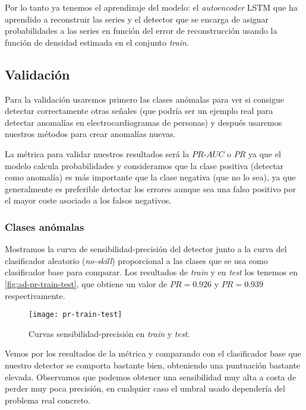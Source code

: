 Por lo tanto ya tenemos el aprendizaje del modelo: el \emph{autoencoder} LSTM que ha aprendido a reconstruir las series y el detector que se encarga de asignar probabilidades a las series en función del error de reconstrucción usando la función de densidad estimada en el conjunto \emph{train}.

\subsection{Validación}

Para la validación usaremos primero las clases anómalas para ver si consigue detectar correctamente otras señales (que podría ser un ejemplo real para detectar anomalías en electrocardiogramas de personas) y después usaremos nuestros métodos para crear anomalías nuevas.

La métrica para validar nuestros resultados será la $PR$-$AUC$ o $PR$ ya que el modelo calcula probabilidades y consideramos que la clase positiva (detectar como anomalía) es más importante que la clase negativa (que no lo sea), ya que generalmente es preferible detectar los errores aunque sea una falso positivo por el mayor coste asociado a los falsos negativos.

\subsubsection{Clases anómalas}

Mostramos la curva de sensibilidad-precisión del detector junto a la curva del clasificador aleatorio (\emph{no-skill}) proporcional a las clases que se usa como clasificador base para comparar. Los resultados de \emph{train} y en \emph{test} los tenemos en \autoref{fig:ad-pr-train-test}, que obtiene un valor de $PR = 0.926$ y $PR = 0.939$ respectivamente.

\begin{figure}[htpb]
  \centering
  \texttt{[image: pr-train-test]}
  \caption{Curvas sensibilidad-precisión en \emph{train} y \emph{test}.}
  \label{fig:ad-pr-train-test}
\end{figure}

Vemos por los resultados de la métrica y comparando con el clasificador base que nuestro detector se comporta bastante bien, obteniendo una puntuación bastante elevada. Observamos que podemos obtener una sensibilidad muy alta a costa de perder muy poca precisión, en cualquier caso el umbral usado dependería del problema real concreto.

